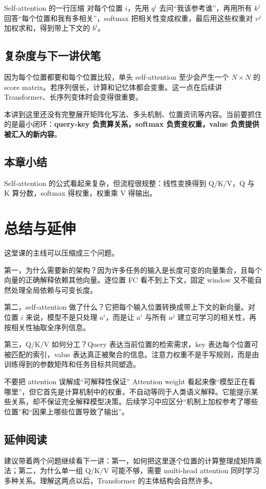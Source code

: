 \documentclass[a4paper]{article}
\begin{document}
\begin{importantbox}{Self-attention 的一行压缩}
    对每个位置 $i$，先用 $q^i$ 去问“我该参考谁”，再用所有 $k^j$ 回答“每个位置和我有多相关”，softmax 把相关性变成权重，最后用这些权重对 $v^j$ 加权求和，得到带上下文的 $b^i$。
\end{importantbox}

\subsection{复杂度与下一讲伏笔}

因为每个位置都要和每个位置比较，单头 self-attention 至少会产生一个 $N\times N$ 的 score matrix。若序列很长，计算和记忆体都会变重。这一点在后续讲 Transformer、长序列变体时会变得很重要。

本讲到这里还没有完整展开矩阵化写法、多头机制、位置资讯等内容。当前要抓住的是最小闭环：\textbf{query-key 负责算关系，softmax 负责变权重，value 负责提供被汇入的新内容}。

\subsection{本章小结}

Self-attention 的公式看起来复杂，但流程很规整：线性变换得到 Q/K/V，Q 与 K 算分数，softmax 得权重，权重乘 V 得输出。

\section{总结与延伸}

这堂课的主线可以压缩成三个问题。

第一，为什么需要新的架构？因为许多任务的输入是长度可变的向量集合，且每个向量的正确解释依赖其他向量。逐位置 FC 看不到上下文，固定 window 又不能自然处理全局依赖与可变长度。

第二，self-attention 做了什么？它把每个输入位置转换成带上下文的新向量。对位置 $i$ 来说，模型不是只处理 $a^i$，而是让 $a^i$ 与所有 $a^j$ 建立可学习的相关性，再按相关性抽取全序列信息。

第三，Q/K/V 如何分工？Query 表达当前位置的检索需求，key 表达每个位置可被匹配的索引，value 表达真正被聚合的信息。注意力权重不是手写规则，而是由训练得到的参数矩阵和任务目标共同塑造。

\begin{warningbox}{不要把 attention 误解成“可解释性保证”}
    Attention weight 看起来像“模型正在看哪里”，但它首先是计算机制中的权重，不自动等同于人类语义解释。它能提示某些关系，却不保证完全解释模型决策。后续学习中应区分“机制上加权参考了哪些位置”和“因果上哪些位置导致了输出”。
\end{warningbox}

\subsection{延伸阅读}

建议带着两个问题继续看下一讲：第一，如何把这里逐个位置的计算整理成矩阵乘法；第二，为什么单一组 Q/K/V 可能不够，需要 multi-head attention 同时学习多种关系。理解这两点以后，Transformer 的主体结构会自然许多。
\end{document}
